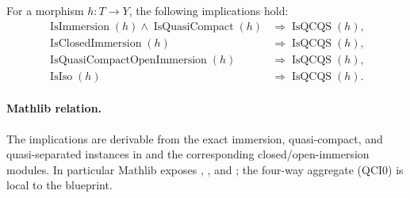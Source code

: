 \begin{lemma}
  \label{lemma:nagata-immersion-qcqs-criteria}

  For a morphism $h\colon T\to Y$, the following implications hold:
  \[
  \begin{aligned}
    \operatorname{IsImmersion}(h)\wedge
      \operatorname{IsQuasiCompact}(h)
      &\Longrightarrow\operatorname{IsQCQS}(h),\\
    \operatorname{IsClosedImmersion}(h)
      &\Longrightarrow\operatorname{IsQCQS}(h),\\
    \operatorname{IsQuasiCompactOpenImmersion}(h)
      &\Longrightarrow\operatorname{IsQCQS}(h),\\
    \operatorname{IsIso}(h)
      &\Longrightarrow\operatorname{IsQCQS}(h).
  \end{aligned}                                                     \tag{QCI0}
  \]

  \paragraph{Mathlib relation.}
  The implications are derivable from the exact immersion, quasi-compact,
  and quasi-separated instances in
  \texttt{} and
  the corresponding closed/open-immersion modules.  In particular Mathlib
  exposes
  \texttt{},
  \texttt{},
  and
  \texttt{};
  the four-way
  aggregate (QCI0) is local to the blueprint.
\end{lemma}

